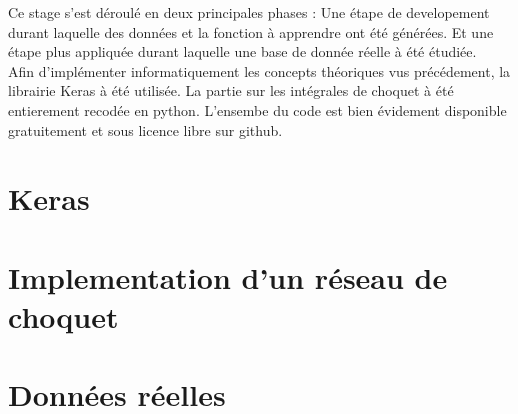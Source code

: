 Ce stage s'est déroulé en deux principales phases :
Une étape de developement durant laquelle des données et la fonction à apprendre ont été générées.
Et une étape plus appliquée durant laquelle une base de donnée réelle à été étudiée.\\


Afin d'implémenter informatiquement les concepts théoriques vus précédement, la librairie Keras à été utilisée\cite{keras}.
La partie sur les intégrales de choquet à été entierement recodée en python.
L'ensembe du code est bien évidement disponible gratuitement et sous licence libre sur github\cite{repoStage}.

\section{Keras}\label{sec:keras}


\newpage
\section{Implementation d'un réseau de choquet}\label{sec:implementation-choquet}


\newpage
\section{Données réelles}\label{sec:données-réelles}


